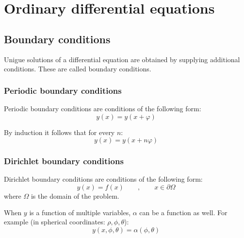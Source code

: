 \chapter{Ordinary differential equations}
\section{Boundary conditions}
	Unigue solutions of a differential equation are obtained by supplying additional conditions. These are called boundary conditions.
    
    \subsection{Periodic boundary conditions}
    	Periodic boundary conditions are conditions of the following form:
    	\begin{equation}
			\label{diffeq:conditions:periodic}
            y(x) = y(x + \varphi)
		\end{equation}
        
        \noindent By induction it follows that for every $n$:
        \begin{equation}
			\label{diffeq:conditions:periodic_n}
            y(x) = y(x + n\varphi)
		\end{equation}
        
	\subsection{Dirichlet boundary conditions}
    	Dirichlet boundary conditions are conditions of the following form:
    	\begin{equation}
			\label{diffeq:conditions:dirichlet}
            y(x) = f(x)\qquad,\qquad x\in\partial\Omega
		\end{equation}
        where $\Omega$ is the domain of the problem.
        
        \begin{remark}
            When $y$ is a function of multiple variables, $\alpha$ can be a function as well. For example (in spherical coordinates: $\rho, \phi, \theta$):
            \begin{equation}
                \label{diffeq:conditions:dirichlet_multi}
                y(x, \phi, \theta) = \alpha(\phi, \theta)
            \end{equation}
		\end{remark}
        
